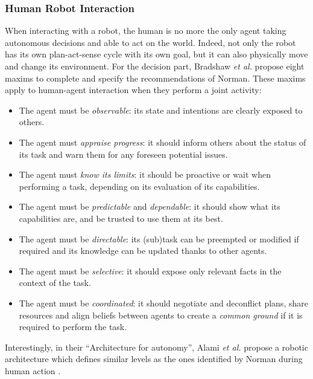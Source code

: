 \documentclass[a4paper,11pt,twoside]{StyleThese}
\begin{document}
\subsubsection{Human Robot Interaction}
When interacting with a robot, the human is no more the only agent taking autonomous decisions and able to act on the world. Indeed, not only the robot has its own plan-act-sense cycle with its own goal, but it can also physically move and change its environment. For the decision part, Bradshaw \textit{et al.} \cite{bradshaw2011human} propose eight maxims to complete and specify the recommendations of Norman. These maxims apply to human-agent interaction when they perform a joint activity:
\begin{itemize}
\item The agent must be \textit{observable}: its state and intentions are clearly exposed to others.
\item The agent must \textit{appraise progress}: it should inform others about the status of its task and warn them for any foreseen potential issues.
\item The agent must \textit{know its limits}: it should be proactive or wait when performing a task, depending on its evaluation of its capabilities.
\item The agent must be \textit{predictable} and \textit{dependable}: it should show what its capabilities are, and be trusted to use them at its best.
\item The agent must be \textit{directable}: its (sub)task can be preempted or modified if required and its knowledge can be updated thanks to other agents.
\item The agent must be \textit{selective}: it should expose only relevant facts in the context of the task.
\item The agent must be \textit{coordinated}: it should negotiate and deconflict plans, share resources and align beliefs between agents to create a \textit{common ground} if it is required to perform the task.
\end{itemize}


Interestingly, in their ``Architecture for autonomy'', Alami \textit{et al.} propose a robotic architecture which defines similar levels as the ones identified by Norman during human action \cite{alami1998architecture}.
\end{document}
